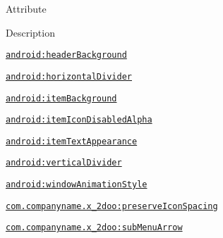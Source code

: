 Attribute

Description 

{\tt \hyperlink{classandroid_1_1support_1_1v4_1_1_r_1_1styleable_64d916065b7bff29e75fd9d984101ef0}{android:headerBackground}}

{\tt \hyperlink{classandroid_1_1support_1_1v4_1_1_r_1_1styleable_c6c0a8c4be773bbaff1bdb2cd894c2ab}{android:horizontalDivider}}

{\tt \hyperlink{classandroid_1_1support_1_1v4_1_1_r_1_1styleable_9fd625d2301e72bc9b04d2fca592d709}{android:itemBackground}}

{\tt \hyperlink{classandroid_1_1support_1_1v4_1_1_r_1_1styleable_020f8607a79d9f432c3dc7dda196136b}{android:itemIconDisabledAlpha}}

{\tt \hyperlink{classandroid_1_1support_1_1v4_1_1_r_1_1styleable_f5aae86805e86421e406c3299856bfae}{android:itemTextAppearance}}

{\tt \hyperlink{classandroid_1_1support_1_1v4_1_1_r_1_1styleable_463a5ddae67100490816566a6e87082b}{android:verticalDivider}}

{\tt \hyperlink{classandroid_1_1support_1_1v4_1_1_r_1_1styleable_2235933d1e99168194dc75356546ce5f}{android:windowAnimationStyle}}

{\tt \hyperlink{classandroid_1_1support_1_1v4_1_1_r_1_1styleable_1a86f6ebd0fdcf4d5eadc06edfcd42c6}{com.companyname.x\_\-2doo:preserveIconSpacing}}

{\tt \hyperlink{classandroid_1_1support_1_1v4_1_1_r_1_1styleable_4e42622f8c86c7431121ce63d8486454}{com.companyname.x\_\-2doo:subMenuArrow}}

